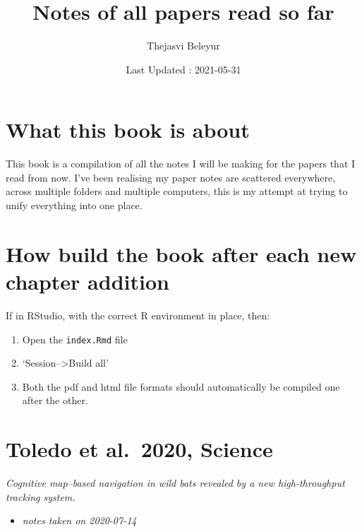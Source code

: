 \documentclass[
]{book}
\title{Notes of all papers read so far}
\author{Thejasvi Beleyur}
\date{Last Updated : 2021-05-31}
\providecommand{\tightlist}{%
  \setlength{\itemsep}{0pt}\setlength{\parskip}{0pt}}
\begin{document}
\maketitle

{
\setcounter{tocdepth}{1}
\tableofcontents
}
\hypertarget{what-this-book-is-about}{%
\chapter*{What this book is about}\label{what-this-book-is-about}}

This book is a compilation of all the notes I will be making for the papers that I read from now.
I've been realising my paper notes are scattered everywhere, across multiple folders and multiple computers,
this is my attempt at trying to unify everything into one place.

\hypertarget{how-build-the-book-after-each-new-chapter-addition}{%
\chapter{How build the book after each new chapter addition}\label{how-build-the-book-after-each-new-chapter-addition}}

If in RStudio, with the correct R environment in place, then:

\begin{enumerate}
\def\labelenumi{\arabic{enumi}.}
\tightlist
\item
  Open the \texttt{index.Rmd} file
\item
  `Session--\textgreater Build all'
\item
  Both the pdf and html file formats should automatically be compiled one after the other.
\end{enumerate}

\hypertarget{toledo-et-al.-2020-science}{%
\chapter{Toledo et al.~2020, Science}\label{toledo-et-al.-2020-science}}


\emph{Cognitive map--based navigation in wild bats revealed by a new high-throughput tracking system.} \citep{toledo2020cognitive}

\begin{itemize}
\tightlist
\item
  \emph{notes taken on 2020-07-14}
\end{itemize}
\end{document}
